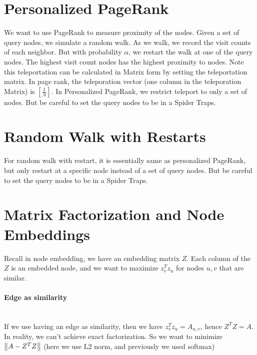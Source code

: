 \section{Personalized PageRank}
We want to use PageRank to measure proximity of the nodes. Given a set of query nodes, we simulate a random walk. As we walk, we record the visit counts of each neighbor. But with probability $\alpha$, we restart the walk at one of the query nodes. The highest visit count nodes has the highest proximity to nodes. Note this teleportation can be calculated in Matrix form by setting the teleportation matrix. In page rank, the teleporation vector (one column in the teleporation Matrix) is $[\frac{1}{N}]$. In Personalized PageRank, we restrict teleport to only a set of nodes. But be careful to set the query nodes to be in a Spider Traps. 


\section{Random Walk with Restarts}
For random walk with restart, it is essentially same as personalized PageRank, but only restart at a specific node instead of a set of query nodes. But be careful to set the query nodes to be in a Spider Traps. 


\section{Matrix Factorization and Node Embeddings} 
Recall in node embedding, we have an embedding matrix $Z$. Each column of the $Z$ is an embedded node, and we want to maximize $z_v^Tz_u$ for nodes $u, v$ that are similar. \\
\paragraph{Edge as similarity}\mbox{}\\
If we use having an edge as similarity, then we have $z_v^Tz_u = A_{u,v}$, hence $Z^TZ = A$. In reality, we can't achieve exact factorization. So we want to minimize $\left\lVert A - Z^TZ\right\rVert$ (here we use L2 norm, and previously we used softmax)

